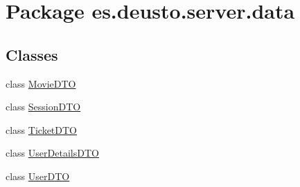 \hypertarget{namespacees_1_1deusto_1_1server_1_1data}{}\section{Package es.\+deusto.\+server.\+data}
\label{namespacees_1_1deusto_1_1server_1_1data}
\subsection*{Classes}
\begin{DoxyCompactItemize}
\item 
class \mbox{\hyperlink{classes_1_1deusto_1_1server_1_1data_1_1_movie_d_t_o}{Movie\+D\+TO}}
\item 
class \mbox{\hyperlink{classes_1_1deusto_1_1server_1_1data_1_1_session_d_t_o}{Session\+D\+TO}}
\item 
class \mbox{\hyperlink{classes_1_1deusto_1_1server_1_1data_1_1_ticket_d_t_o}{Ticket\+D\+TO}}
\item 
class \mbox{\hyperlink{classes_1_1deusto_1_1server_1_1data_1_1_user_details_d_t_o}{User\+Details\+D\+TO}}
\item 
class \mbox{\hyperlink{classes_1_1deusto_1_1server_1_1data_1_1_user_d_t_o}{User\+D\+TO}}
\end{DoxyCompactItemize}
